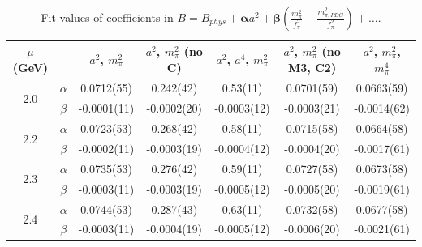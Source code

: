 \documentclass[12pt]{extarticle}
\begin{document}
\begin{table}[h!]
\begin{center}
\begin{tabular}{|c c|c|c|c|c|c|}
\hline
$\mu$ (GeV) &  & $a^2$, $m_\pi^2$& $a^2$, $m_\pi^2$ (no C)& $a^2$, $a^4$, $m_\pi^2$& $a^2$, $m_\pi^2$ (no M3, C2)& $a^2$, $m_\pi^2$, $m_\pi^4$\\
\hline
\multirow{2}{0.5in}{2.0} & $\alpha$ & 0.0712(55)& 0.242(42)& 0.53(11)& 0.0701(59)& 0.0663(59)\\
 & $\beta$ & -0.0001(11)& -0.0002(20)& -0.0003(12)& -0.0003(21)& -0.0014(62)\\
\hline
\multirow{2}{0.5in}{2.2} & $\alpha$ & 0.0723(53)& 0.268(42)& 0.58(11)& 0.0715(58)& 0.0664(58)\\
 & $\beta$ & -0.0002(11)& -0.0003(19)& -0.0004(12)& -0.0004(20)& -0.0017(61)\\
\hline
\multirow{2}{0.5in}{2.3} & $\alpha$ & 0.0735(53)& 0.276(42)& 0.59(11)& 0.0727(58)& 0.0673(58)\\
 & $\beta$ & -0.0003(11)& -0.0003(19)& -0.0005(12)& -0.0005(20)& -0.0019(61)\\
\hline
\multirow{2}{0.5in}{2.4} & $\alpha$ & 0.0744(53)& 0.287(43)& 0.63(11)& 0.0732(58)& 0.0677(58)\\
 & $\beta$ & -0.0003(11)& -0.0004(19)& -0.0005(12)& -0.0006(20)& -0.0021(61)\\
\hline
\end{tabular}
\caption{Fit values of coefficients in $B = B_{phys} + \mathbf{\alpha} a^2 + \mathbf{\beta}\left(\frac{m_\pi^2}{f_\pi^2}-\frac{m_{\pi,PDG}^2}{f_\pi^2}\right) + \ldots$.}
\end{center}
\end{table}




















\clearpage
\end{document}
